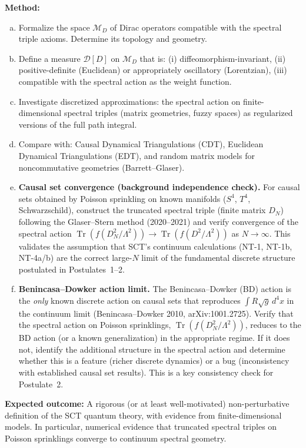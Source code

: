 \documentclass[12pt,a4paper]{article}
\newcommand{\Tr}{\operatorname{Tr}}
\newcommand{\method}[1]{\noindent\textbf{Method:} #1\par}
\newcommand{\outcome}[1]{\noindent\textbf{Expected outcome:} #1\par}
\begin{document}
\method{
\begin{enumerate}[(a)]
  \item Formalize the space $\mathcal{M}_D$ of Dirac operators compatible
    with the spectral triple axioms. Determine its topology and geometry.
  \item Define a measure $\mathcal{D}[D]$ on $\mathcal{M}_D$ that is:
    (i) diffeomorphism-invariant, (ii) positive-definite (Euclidean) or
    appropriately oscillatory (Lorentzian), (iii) compatible with the
    spectral action as the weight function.
  \item Investigate discretized approximations: the spectral action on
    finite-dimensional spectral triples (matrix geometries, fuzzy spaces)
    as regularized versions of the full path integral.
  \item Compare with: Causal Dynamical Triangulations (CDT), Euclidean
    Dynamical Triangulations (EDT), and random matrix models for
    noncommutative geometries (Barrett--Glaser).
  \item \textbf{Causal set convergence (background independence check).}
    For causal sets obtained by Poisson sprinkling on known manifolds
    ($S^4$, $T^4$, Schwarzschild), construct the truncated spectral triple
    (finite matrix $D_N$) following the Glaser--Stern method (2020--2021)
    and verify convergence of the spectral action
    $\Tr(f(D_N^2/\Lambda^2)) \to \Tr(f(D^2/\Lambda^2))$ as $N \to \infty$.
    This validates the assumption that SCT's continuum calculations (NT-1,
    NT-1b, NT-4a/b) are the correct large-$N$ limit of the fundamental discrete
    structure postulated in Postulates~1--2.
  \item \textbf{Benincasa--Dowker action limit.}
    The Benincasa--Dowker (BD) action is the \emph{only} known discrete action
    on causal sets that reproduces $\int R\sqrt{g}\,d^4x$ in the continuum limit
    (Benincasa--Dowker 2010, arXiv:1001.2725). Verify that the spectral action
    on Poisson sprinklings, $\Tr(f(D_N^2/\Lambda^2))$, reduces to the BD action
    (or a known generalization) in the appropriate regime. If it does not,
    identify the additional structure in the spectral action and determine
    whether this is a feature (richer discrete dynamics) or a bug (inconsistency
    with established causal set results). This is a key consistency check for
    Postulate~2.
\end{enumerate}
}

\outcome{A rigorous (or at least well-motivated) non-perturbative definition
of the SCT quantum theory, with evidence from finite-dimensional models.
In particular, numerical evidence that truncated spectral triples on Poisson
sprinklings converge to continuum spectral geometry.}
\end{document}
